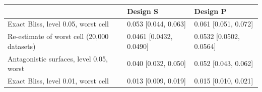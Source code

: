 \begin{tabular}{@{}lll@{}}
\toprule
 & Design S & Design P\\
\midrule
Exact Bliss, level 0.05, worst cell & 0.053 [0.044, 0.063] & 0.061 [0.051, 0.072]\\
Re-estimate of worst cell (20,000 datasets) & 0.0461 [0.0432, 0.0490] & 0.0532 [0.0502, 0.0564]\\
Antagonistic surfaces, level 0.05, worst & 0.040 [0.032, 0.050] & 0.052 [0.043, 0.062]\\
Exact Bliss, level 0.01, worst cell & 0.013 [0.009, 0.019] & 0.015 [0.010, 0.021]\\
\bottomrule
\end{tabular}
